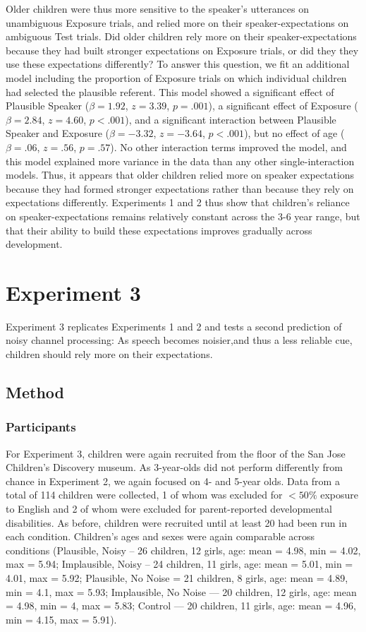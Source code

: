 \documentclass[man,floatsintext]{apa6}
\begin{document}
Older children were thus more sensitive to the speaker's utterances on unambiguous Exposure trials, and relied more on their speaker-expectations on ambiguous Test trials. Did older children rely more on their speaker-expectations because they had built stronger expectations on Exposure trials, or did they they use these expectations differently? To answer this question, we fit an additional model including the proportion of Exposure trials on which individual children had selected the plausible referent. This model showed a significant effect of Plausible Speaker ($\beta = 1.92$, $z = 3.39$, $p = .001$), a significant effect of Exposure ($\beta = 2.84$, $z = 4.60$, $p < .001$), and a significant interaction between Plausible Speaker and Exposure ($\beta = -3.32$, $z = -3.64$, $p < .001$), but no effect of age ($\beta = .06$, $z = .56$, $p = .57$). No other interaction terms improved the model, and this model explained more variance in the data than any other single-interaction models. Thus, it appears that older children relied more on speaker expectations because they had formed stronger expectations rather than because they rely on expectations differently. Experiments 1 and 2 thus show that children's reliance on speaker-expectations remains relatively constant across the 3-6 year range, but that their ability to build these expectations improves gradually across development.


\section{Experiment 3}

Experiment 3 replicates Experiments 1 and 2 and tests a second prediction of noisy channel processing: As speech becomes noisier,and thus a less reliable cue, children should rely more on their expectations.

\subsection{Method}

\subsubsection{Participants}

For Experiment 3, children were again recruited from the floor of the San Jose Children's Discovery museum. As 3-year-olds did not perform differently from chance in Experiment 2, we again focused on 4- and 5-year olds. Data from a total of 114 children were collected, 1 of whom was excluded for $<50\%$ exposure to English and 2 of whom were excluded for parent-reported developmental disabilities. As before, children were recruited until at least 20 had been run in each condition. Children's ages and sexes were again comparable across conditions (Plausible, Noisy -- 26 children, 12 girls, age: mean = 4.98, min = 4.02, max = 5.94; Implausible, Noisy -- 24 children, 11 girls, age: mean = 5.01, min = 4.01, max = 5.92; Plausible, No Noise = 21 children, 8 girls, age: mean = 4.89, min = 4.1, max = 5.93; Implausible, No Noise --- 20 children, 12 girls, age: mean = 4.98, min = 4, max = 5.83; Control --- 20 children, 11 girls, age: mean = 4.96, min = 4.15, max = 5.91).
\end{document}

